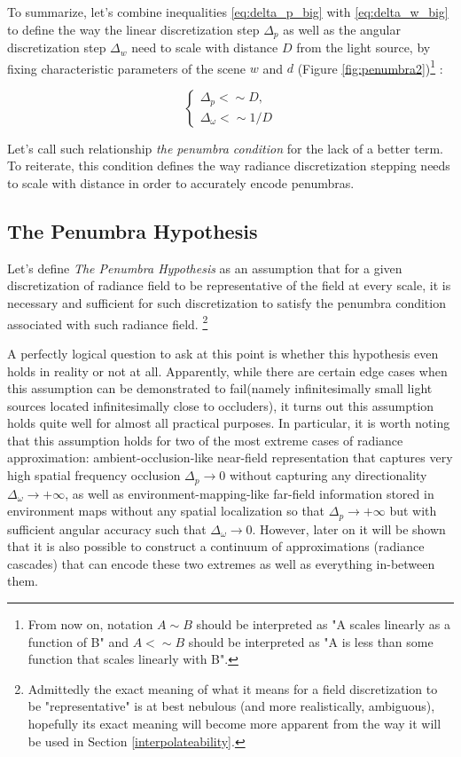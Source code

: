 \documentclass{jcgt}
\begin{document}
To summarize, let's combine inequalities \ref{eq:delta_p_big} with \ref{eq:delta_w_big} to define the way the linear discretization step $\Delta_p$
as well as the angular discretization step $\Delta_w$ need to scale with distance $D$ from the light source, by fixing characteristic parameters of the scene $w$ and $d$ (Figure \ref {fig:penumbra2})\footnote{From now on, notation $A \sim B$ should be interpreted as "A scales linearly as a function of B" and $A <\sim B$ should be interpreted as "A is less than some function that scales linearly with B".} :

\begin{equation}
  \begin{cases}
    \Delta_p <\sim D, \\
    \Delta_\omega <\sim 1/D
  \end{cases}
  \label{eq:pen_cond}
\end{equation}

Let's call such relationship \emph{the penumbra condition} for the lack of a better term. To reiterate, this condition defines the way radiance discretization stepping needs to scale with distance in order to accurately encode penumbras.

\subsection{The Penumbra Hypothesis}

Let's define \emph{The Penumbra Hypothesis} as an assumption that for a given discretization of radiance field to be representative of the field at every scale, it is necessary and sufficient for such discretization
to satisfy the penumbra condition associated with such radiance field. \footnote{
Admittedly the exact meaning of what it means for a field discretization to be "representative" is at best nebulous (and more realistically, ambiguous), hopefully its exact meaning will become more apparent from the way it will be used in Section \ref{interpolateability}.}

A perfectly logical question to ask at this point is whether this hypothesis even holds in reality or not at all. Apparently, while there are certain edge cases when this assumption can be demonstrated to fail(namely infinitesimally
small light sources located infinitesimally close to occluders), it turns out this assumption holds quite well for almost all practical purposes. In particular, it is worth noting that
this assumption holds for two of the most extreme cases of radiance approximation: ambient-occlusion-like near-field representation that captures very high spatial frequency occlusion $\Delta_p \to 0$ without capturing any directionality $\Delta_\omega \to +\infty$, as well as environment-mapping-like far-field information stored in environment maps without any spatial localization so that $\Delta_p \to +\infty$
but with sufficient angular accuracy such that $\Delta_\omega \to 0$. However, later on it will be shown that it is also possible to construct a continuum of approximations (radiance cascades) that can encode
these two extremes as well as everything in-between them.
\end{document}

